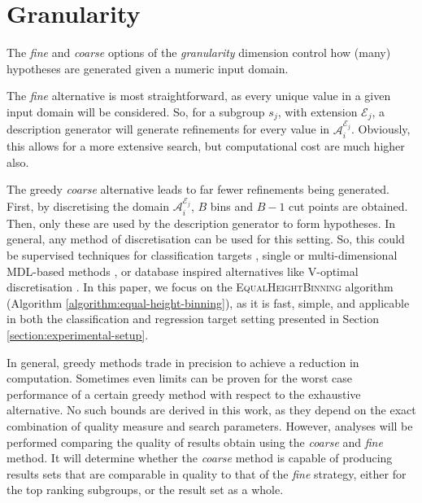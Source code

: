 \documentclass[smallextended]{svjour3}
\newcommand{\extension}[1]{\mathcal{E}_{#1}}
\newcommand{\dimension}{\emph}
\newcommand{\parameter}{\emph}
\newcommand{\fine}{\parameter{fine}}
\newcommand{\coarse}{\parameter{coarse}}
\newcommand{\eh}{\textsc{EqualHeightBinning}}
\begin{document}
\section{Granularity}
\label{section:granularity}

The \fine{} and \coarse{} options of the \dimension{granularity} dimension control how (many) hypotheses are generated given a numeric input domain.

The \fine{} alternative is most straightforward, as every unique value in a given input domain will be considered.
So, for a subgroup $s_j$, with extension $\extension{j}$, a description generator will generate refinements for every value in $\mathcal{A}_i^{\extension{j}}$.
Obviously, this allows for a more extensive search, but computational cost are much higher also.

The greedy \coarse{} alternative leads to far fewer refinements being generated.
First, by discretising the domain $\mathcal{A}_i^{\extension{j}}$, $B$ bins and $B{-}1$ cut points are obtained.
Then, only these are used by the description generator to form hypotheses.
In general, any method of discretisation can be used for this setting.
So, this could be supervised techniques for classification targets \cite{fayyad:1993}, single \cite{kontkanen:2007} or multi-dimensional MDL-based methods \cite{nguyen:2014}, or database inspired alternatives like V-optimal discretisation \cite{ioannidis:2003}.
In this paper, we focus on the \eh{} algorithm (Algorithm \ref{algorithm:equal-height-binning}), as it is fast, simple, and applicable in both the classification and regression target setting presented in Section \ref{section:experimental-setup}.

In general, greedy methods trade in precision to achieve a reduction in computation.
Sometimes even limits can be proven for the worst case performance of a certain greedy method with respect to the exhaustive alternative.
No such bounds are derived in this work, as they depend on the exact combination of quality measure and search parameters.
However, analyses will be performed comparing the quality of results obtain using the \coarse{} and \fine{} method.
It will determine whether the \coarse{} method is capable of producing results sets that are comparable in quality to that of the \fine{} strategy, either for the top ranking subgroups, or the result set as a whole.
\end{document}
